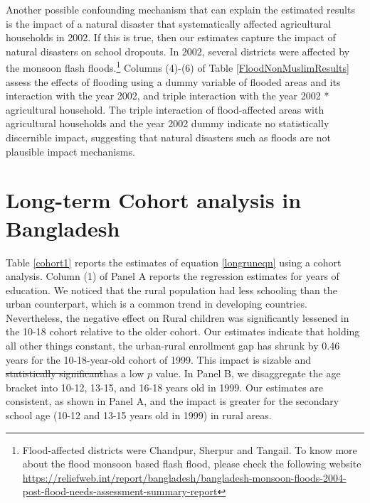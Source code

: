 \documentclass[12pt,letterpaper]{article}
\newcommand{\0}{\ensuremath{\mbox{\boldmath $0$}}}
\begin{document}
Another possible confounding mechanism that can explain the estimated results is the impact of a natural disaster that systematically affected agricultural households in 2002. If this is true, then our estimates capture the impact of natural disasters on school dropouts. In 2002, several districts were affected by the monsoon flash floods.\footnote{Flood-affected districts were Chandpur, Sherpur and Tangail. To know more about the flood monsoon based flash flood, please check the following website \url{https://reliefweb.int/report/bangladesh/bangladesh-monsoon-floods-2004-post-flood-needs-assessment-summary-report} } Columns (4)-(6) of Table \ref{FloodNonMuslimResults} assess the effects of flooding using a dummy variable of flooded areas and its interaction with the year 2002, and triple interaction with the year 2002 * agricultural household. The triple interaction of flood-affected areas with agricultural households and the year 2002 dummy indicate no statistically discernible impact, suggesting that natural disasters such as floods are not plausible impact mechanisms.


\section{Long-term Cohort analysis in Bangladesh\label{sec.long-term}}


Table \ref{cohort1} reports the estimates of equation \ref{longruneqn} using a cohort analysis. Column (1) of Panel A reports the regression estimates for years of education. We noticed that the rural population had less schooling than the urban counterpart, which is a common trend in developing countries. Nevertheless, the negative effect on Rural children was significantly lessened in the 10-18 cohort relative to the older cohort. Our estimates indicate that holding all other things constant, the urban-rural enrollment gap has shrunk by 0.46 years for the 10-18-year-old cohort of 1999. This impact is sizable and \sout{statistically significant}has a low $p$ value. In Panel B, we disaggregate the age bracket into 10-12, 13-15, and 16-18 years old in 1999. Our estimates are consistent, as shown in Panel A, and the impact is greater for the secondary school age (10-12 and 13-15 years old in 1999) in rural areas. 
\end{document}
